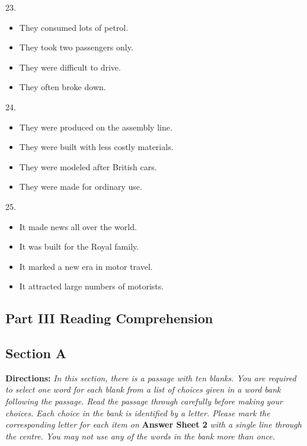 \documentclass[UTF8,11pt]{ctexart}
\begin{document}
23.


\begin{itemize}[leftmargin=2em,itemsep=.2em,topsep=.4em]\item[A.] They consumed lots of petrol.
\item[B.] They took two passengers only.
\item[C.] They were difficult to drive.
\item[D.] They often broke down.
\end{itemize}

24.


\begin{itemize}[leftmargin=2em,itemsep=.2em,topsep=.4em]\item[A.] They were produced on the assembly line.
\item[B.] They were built with less costly materials.
\item[C.] They were modeled after British cars.
\item[D.] They were made for ordinary use.
\end{itemize}

25.


\begin{itemize}[leftmargin=2em,itemsep=.2em,topsep=.4em]\item[A.] It made news all over the world.
\item[B.] It was built for the Royal family.
\item[C.] It marked a new era in motor travel.
\item[D.] It attracted large numbers of motorists.
\end{itemize}

\subsection*{\textbf{Part III} \textbf{Reading Comprehension}}


\subsection*{\textbf{Section A}}


\textbf{Directions:}\textit{ In this section, there is a passage with ten blanks. You are required to select one word for each blank} \textit{from a list of choices given in a word bank following the passage. Read the passage through carefully before making} \textit{your choices. Each choice in the bank is identified by a letter. Please mark the corresponding letter for each item on} \textbf{Answer Sheet 2}\textit{ with a single line through the centre. You may not use any of the words in the bank more than once.}
\end{document}
